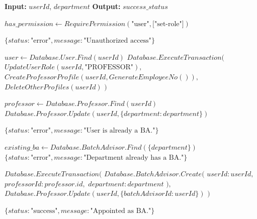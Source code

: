 \begin{algorithm}[H]
\caption{BA Appointment Workflow}
\begin{algorithmic}[1]

\State \textbf{Input:} $userId$, $department$
\State \textbf{Output:} $success\_status$


    \State {}
    \State $has\_permission \gets RequirePermission(\text{"user"}, \text{["set-role"]})$

        \State \Return $\{status: \text{"error"}, message: \text{"Unauthorized access"}\}$
    \EndIf

    \State {}
    \State $user \gets Database.User.Find(userId)$
        \State {}
        \State $Database.ExecuteTransaction($
        \State \quad $UpdateUserRole(userId, \text{"PROFESSOR"}),$
        \State \quad $CreateProfessorProfile(userId, GenerateEmployeeNo()),$
        \State \quad $DeleteOtherProfiles(userId)$
        \State $)$
    \EndIf

    \State {}
    \State $professor \gets Database.Professor.Find(userId)$
        \State $Database.Professor.Update(userId, \{ department: department \})$
    \EndIf

    \State {}
        \State \Return $\{status: \text{"error"}, message: \text{"User is already a BA."}\}$
    \EndIf

    \State $existing\_ba \gets Database.BatchAdvisor.Find(\{ department \})$
        \State \Return $\{status: \text{"error"}, message: \text{"Department already has a BA."}\}$
    \EndIf

    \State {}
    \State $Database.ExecuteTransaction($
    \State \quad $Database.BatchAdvisor.Create($
    \State \quad \quad $userId: userId,$
    \State \quad \quad $professorId: professor.id,$
    \State \quad \quad $department: department$
    \State \quad $),$
    \State \quad $Database.Professor.Update(userId, \{ batchAdvisorId: userId \})$
    \State $)$

    \State \Return $\{status: \text{"success"}, message: \text{"Appointed as BA."}\}$

\EndFunction

\end{algorithmic}
\end{algorithm}

